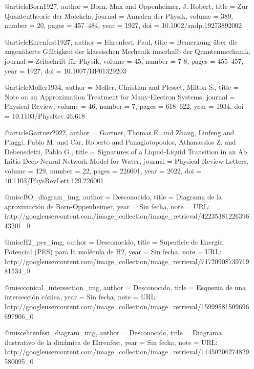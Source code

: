 @article{Born1927,
  author  = {Born, Max and Oppenheimer, J. Robert},
  title   = {Zur Quantentheorie der Molekeln},
  journal = {Annalen der Physik},
  volume  = {389},
  number  = {20},
  pages   = {457--484},
  year    = {1927},
  doi     = {10.1002/andp.19273892002}
}

@article{Ehrenfest1927,
  author  = {Ehrenfest, Paul},
  title   = {Bemerkung über die angenäherte Gültigkeit der klassischen Mechanik innerhalb der Quantenmechanik},
  journal = {Zeitschrift für Physik},
  volume  = {45},
  number  = {7-8},
  pages   = {455--457},
  year    = {1927},
  doi     = {10.1007/BF01329203}
}

@article{Moller1934,
  author  = {Møller, Christian and Plesset, Milton S.},
  title   = {Note on an Approximation Treatment for Many-Electron Systems},
  journal = {Physical Review},
  volume  = {46},
  number  = {7},
  pages   = {618--622},
  year    = {1934},
  doi     = {10.1103/PhysRev.46.618}
}

@article{Gartner2022,
  author  = {Gartner, Thomas E. and Zhang, Linfeng and Piaggi, Pablo M. and Car, Roberto and Panagiotopoulos, Athanassios Z. and Debenedetti, Pablo G.},
  title   = {Signatures of a Liquid-Liquid Transition in an Ab Initio Deep Neural Network Model for Water},
  journal = {Physical Review Letters},
  volume  = {129},
  number  = {22},
  pages   = {226001},
  year    = {2022},
  doi     = {10.1103/PhysRevLett.129.226001}
}

@misc{BO_diagram_img,
  author = {{Desconocido}},
  title  = {Diagrama de la aproximaci\'{o}n de Born-Oppenheimer},
  year   = {{Sin fecha}},
  note   = {URL: http://googleusercontent.com/image_collection/image_retrieval/4223538122639643201_0}
}

@misc{H2_pes_img,
  author = {{Desconocido}},
  title  = {Superficie de Energ\'{i}a Potencial (PES) para la mol\'{e}cula de H2},
  year   = {{Sin fecha}},
  note   = {URL: http://googleusercontent.com/image_collection/image_retrieval/7172090873971981534_0}
}

@misc{conical_intersection_img,
  author = {{Desconocido}},
  title  = {Esquema de una intersecci\'{o}n c\'{o}nica},
  year   = {{Sin fecha}},
  note   = {URL: http://googleusercontent.com/image_collection/image_retrieval/15999581509696697906_0}
}

@misc{ehrenfest_diagram_img,
  author = {{Desconocido}},
  title  = {Diagrama ilustrativo de la din\'{a}mica de Ehrenfest},
  year   = {{Sin fecha}},
  note   = {URL: http://googleusercontent.com/image_collection/image_retrieval/14450206274829580095_0}
}

